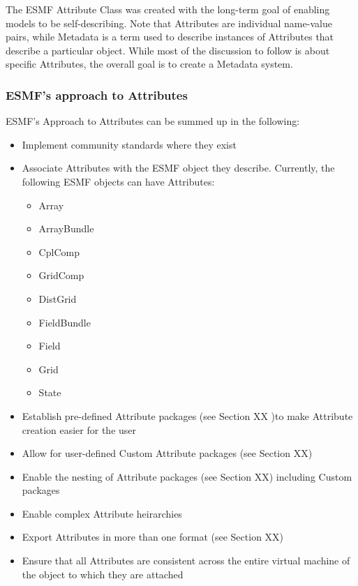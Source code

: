 %


The ESMF Attribute Class was created with the long-term goal of enabling models to be self-describing. Note that Attributes are individual name-value pairs, while Metadata is a term used to describe instances of Attributes that describe a particular object. While most of the discussion to follow is about specific Attributes, the overall goal is to create a Metadata system.   

\subsubsection{ESMF's approach to Attributes}

ESMF's Approach to Attributes can be summed up in the following:

\begin{itemize}
  \item Implement community standards where they exist
  \item Associate Attributes with the ESMF object they describe. Currently, the following ESMF objects can have Attributes:
  \begin{itemize}
     \item Array
     \item ArrayBundle
     \item CplComp
     \item GridComp
     \item DistGrid
     \item FieldBundle
     \item Field
     \item Grid
     \item State
     \end{itemize}
  \item Establish pre-defined Attribute packages (see Section XX )to make Attribute creation easier for the user
  \item Allow for user-defined Custom Attribute packages (see Section XX)
  \item Enable the nesting of Attribute packages (see Section XX) including Custom packages
  \item Enable complex Attribute heirarchies
  \item Export Attributes in more than one format (see Section XX)
  \item Ensure that all Attributes are consistent across the entire virtual machine of the object to which they are attached  
\end{itemize}


